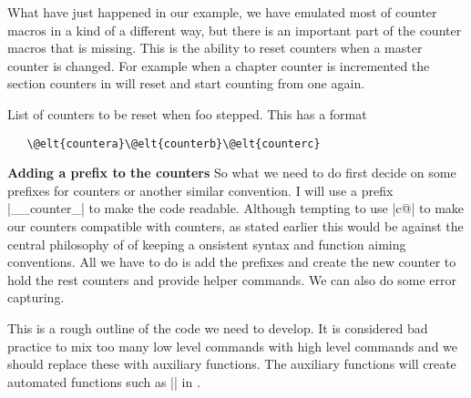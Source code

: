 What have just happened in our example, we have emulated most of \latexe counter macros in a kind of a different way, but there is an important part of the counter macros that is missing. This is the ability to reset counters when a master counter is changed. For example when a chapter counter is incremented the section counters in \latexe will reset and start counting from one again.



 List of counters to be reset when foo stepped. This has a  format
\begin{verbatim}
   \@elt{countera}\@elt{counterb}\@elt{counterc}
\end{verbatim}

\textbf{Adding a prefix to the counters} So what we need to do first decide on some prefixes for counters or another similar convention. I will use a prefix |__counter_| to make the code readable. Although tempting to use |c@|  to make our counters compatible with \latexe counters, as stated earlier this would be against the central philosophy of  of keeping a onsistent syntax and function aiming conventions. All we have to do is add the prefixes and create the new counter to hold the rest counters and provide helper commands. We can also do some error capturing. 


    
This is a rough outline of the code we need to develop. It is considered bad practice to mix too many low level commands with high level commands and we should replace these with auxiliary functions. The auxiliary functions will create automated functions such as |\thechapter| in \latexe.


